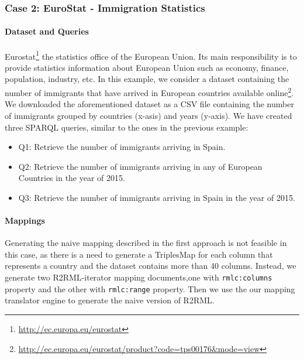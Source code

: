\subsubsection{Case 2: EuroStat - Immigration Statistics}
\noindent\paragraph{Dataset and Queries} Eurostat\footnote{\url{http://ec.europa.eu/eurostat}} the statistics office of the European Union. Its main responsibility is to provide statistics information about European Union such as economy, finance, population, industry, etc. In this example, we consider a dataset containing the number of immigrants that have arrived in European countries available online\footnote{\url{http://ec.europa.eu/eurostat/product?code=tps00176&mode=view}}. We downloaded the aforementioned dataset as a CSV file containing the number of immigrants grouped by countries (x-asis) and years (y-axis). We have created three SPARQL queries, similar to the ones in the previous example:

\begin{itemize}
\item Q1: Retrieve the number of immigrants arriving in Spain.
\item Q2: Retrieve the number of immigrants arriving in any of European Countries in the year of 2015.
\item Q3: Retrieve the number of immigrants arriving in Spain in the year of 2015.
\end{itemize}

\noindent\paragraph{Mappings}
Generating the naive mapping described in the first approach is not feasible in this case, as there is a need to generate a TriplesMap for each column that represents a country and the dataset contains more than 40 columns. Instead, we generate two R2RML-iterator mapping documents,one with \texttt{rmlc:columns} property and the other with \texttt{rmlc:range} property. Then we use the our mapping translator engine to generate the naive version of R2RML.

